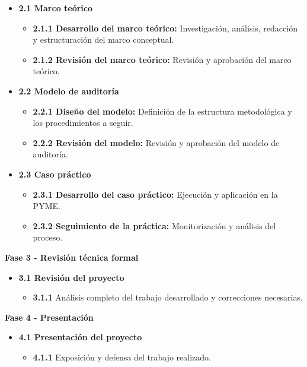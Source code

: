 \documentclass[a4paper, 10pt]{article}
\begin{document}
\begin{itemize}
    \item \textbf{2.1 Marco teórico}
    \begin{itemize}
        \item \textbf{2.1.1 Desarrollo del marco teórico:} Investigación, análisis, redacción y estructuración del marco conceptual.
        \item \textbf{2.1.2 Revisión del marco teórico:} Revisión y aprobación del marco teórico.
    \end{itemize}

    \item \textbf{2.2 Modelo de auditoría}
    \begin{itemize}
        \item \textbf{2.2.1 Diseño del modelo:} Definición de la estructura metodológica y los procedimientos a seguir.
        \item \textbf{2.2.2 Revisión del modelo:} Revisión y aprobación del modelo de auditoría.
    \end{itemize}

    \item \textbf{2.3 Caso práctico}
    \begin{itemize}
        \item \textbf{2.3.1 Desarrollo del caso práctico:} Ejecución y aplicación en la PYME.
        \item \textbf{2.3.2 Seguimiento de la práctica:} Monitorización y análisis del proceso.
    \end{itemize}
\end{itemize}

\vspace{0.5cm}
\textbf{\large Fase 3 - Revisión técnica formal} \vspace{0.5cm}

\begin{itemize}
    \item \textbf{3.1 Revisión del proyecto}
    \begin{itemize}
        \item \textbf{3.1.1} Análisis completo del trabajo desarrollado y correcciones necesarias.
    \end{itemize}
\end{itemize}

\vspace{0.5cm}
\textbf{\large Fase 4 - Presentación} \vspace{0.5cm}

\begin{itemize}
    \item \textbf{4.1 Presentación del proyecto}
    \begin{itemize}
        \item \textbf{4.1.1} Exposición y defensa del trabajo realizado.
    \end{itemize}
\end{itemize}
\end{document}
